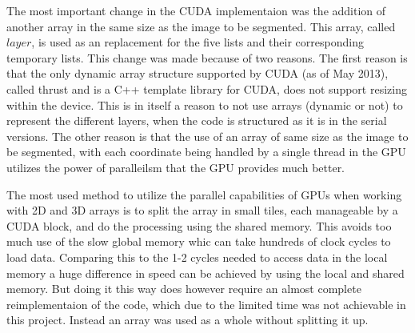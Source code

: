 The most important change in the CUDA implementaion was the addition of another array in the same size as the image to be segmented. This array, called $layer$, is used as an replacement for the five lists and their corresponding temporary lists. This change was made because of two reasons. The first reason is that the only dynamic array structure supported by CUDA (as of May 2013), called thrust and is a C++ template library for CUDA\cite{thrustCuda}, does not support resizing within the device. This is in itself a reason to not use arrays (dynamic or not) to represent the different layers, when the code is structured as it is in the serial versions. The other reason is that the use of an array of same size as the image to be segmented, with each coordinate being handled by a single thread in the GPU utilizes the power of paralleilsm that the GPU provides much better.

The most used method to utilize the parallel capabilities of GPUs when working with 2D and 3D arrays is to split the array in small tiles, each manageable by a CUDA block, and do the processing using the shared memory. This avoids too much use of the slow global memory whic can take hundreds of clock cycles to load data. Comparing this to the 1-2 cycles needed to access data in the local memory a huge difference in speed can be achieved by using the local and shared memory. But doing it this way does however require an almost complete reimplementaion of the code, which due to the limited time was not achievable in this project. Instead an array was used as a whole without splitting it up. 

